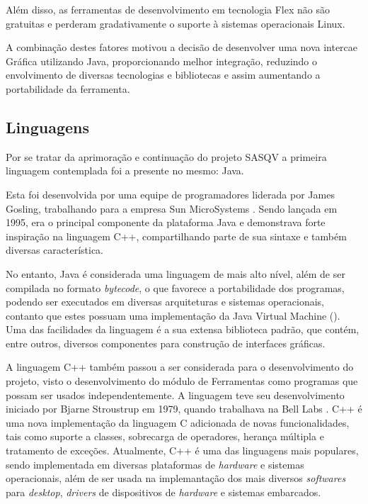 Além disso, as ferramentas de desenvolvimento em tecnologia Flex não são gratuitas e perderam gradativamente o suporte à sistemas operacionais Linux.

A combinação destes fatores motivou a decisão de desenvolver uma nova intercae Gráfica utilizando Java, proporcionando melhor integração, reduzindo o envolvimento de diversas tecnologias e bibliotecas e assim aumentando a portabilidade da ferramenta.

\subsection{Linguagens}

Por se tratar da aprimoração e continuação do projeto SASQV a primeira linguagem contemplada foi a presente no mesmo: Java.

Esta foi desenvolvida por uma equipe de programadores liderada por James Gosling, trabalhando para a empresa Sun MicroSystems \cite{wikijava}. Sendo lançada em 1995, era o principal componente da plataforma Java e demonstrava forte inspiração na linguagem C++, compartilhando parte de sua sintaxe e também diversas característica.

No entanto, Java é considerada uma linguagem de mais alto nível, além de ser compilada no formato \emph{bytecode}, o que favorece a portabilidade dos programas, podendo ser executados em diversas arquiteturas e sistemas operacionais, contanto que estes possuam uma implementação da Java Virtual Machine (). Uma das facilidades da linguagem é a sua extensa biblioteca padrão, que contém, entre outros, diversos componentes para construção de interfaces gráficas.

A linguagem C++ também passou a ser considerada para o desenvolvimento do projeto, visto o desenvolvimento do módulo de Ferramentas como programas que possam ser usados independentemente.
A linguagem teve seu desenvolvimento iniciado por Bjarne Stroustrup em 1979, quando trabalhava na Bell Labs \cite{wikicplusplus}.
C++ é uma nova implementação da linguagem C adicionada de novas funcionalidades, tais como suporte a classes, sobrecarga de operadores, herança múltipla e tratamento de exceções.
Atualmente, C++ é uma das linguagens mais populares, sendo implementada em diversas plataformas de \emph{hardware} e sistemas operacionais, além de ser usada na implemantação dos mais diversos \emph{softwares} para \emph{desktop}, \emph{drivers} de dispositivos de \emph{hardware} e sistemas embarcados.

